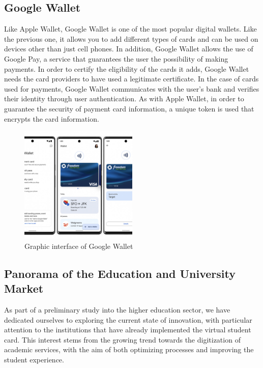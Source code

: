 \documentclass[10pt]{article}
\begin{document}
\subsection{Google Wallet}
Like Apple Wallet, Google Wallet is one of the most popular digital wallets. Like the previous one, it allows you to add different types of cards and can be used on devices other than just cell phones. In addition, Google Wallet allows the use of Google Pay, a service that guarantees the user the possibility of making payments.
In order to certify the eligibility of the cards it adds, Google Wallet needs the card providers to have used a legitimate certificate. In the case of cards used for payments, Google Wallet communicates with the user's bank and verifies their identity through user authentication. As with Apple Wallet, in order to guarantee the security of payment card information, a unique token is used that encrypts the card information.

\begin{figure}[H]
    \centering
    \includegraphics[width=0.5\textwidth]{report-images/google-wallet.png}
    \caption{Graphic interface of Google Wallet}
    \label{fig:my_label}
\end{figure}

\subsection{Panorama of the Education and University Market}
As part of a preliminary study into the higher education sector, we have dedicated ourselves to exploring the current state of innovation, with particular attention to the institutions
that have already implemented the virtual student card. This interest stems from the
growing trend towards the digitization of academic services, with the aim of both
optimizing processes and improving the student experience.
\end{document}
